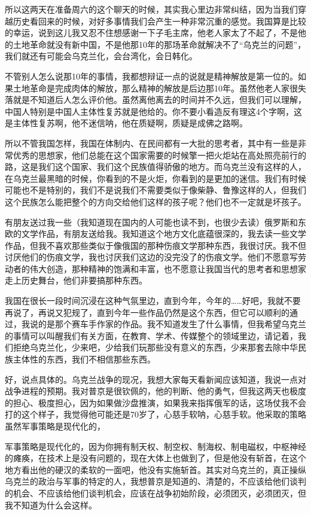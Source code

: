 \documentclass[UTF8, 12pt, a4paper]{ctexrep}
\begin{document}
所以这两天在准备周六的这个聊天的时候，其实我心里边非常纠结，因为当我们穿越历史看回来的时候，对好多事情我们会产生一种非常沉重的感觉。我国算是比较的幸运，说到这儿我又忍不住想感谢一下子毛主席，他老人家太了不起了，不是他的土地革命就没有新中国，不是他那10年的那场革命就解决不了“乌克兰的问题”，我们就还有可能会乌克兰化，会台湾化，会日韩化。

不管别人怎么说那10年的事情，我都想辩证一点的说就是精神解放是第一位的。如果土地革命是完成肉体的解放，那么精神的解放是后边那10年。虽然他老人家很失落就是不知道后人怎么评价他。虽然离他离去的时间并不久远，但我们可以理解，中国人特别是中国人主体性复苏就是他给的。你不要小看造反有理这4个字啊，这是主体性复苏啊，他不迷信呐，他在质疑啊，质疑是成佛之路啊。

所以不管我国怎样，我国在体制内、在民间都有一大批的思考者，其中有一些是非常优秀的思想家，他们总能在这个国家需要的时候擎一把火炬站在高处照亮前行的路，这是我们这个国家、我们这个民族值得骄傲的地方。而乌克兰没有这样的人，在乌克兰最黑暗的时候，你看到的不是火炬，你看到的是更加的迷信。我们有时候可能也不是特别的，我们不是说我们不需要类似于像柴静、鲁豫这样的人，但我们这个民族怎么能把整个的方向交给他们这样的孩子呢？他们也不一定就是坏孩子。

有朋友送过我一些（我知道现在国内的人可能也读不到，也很少去读）俄罗斯和东欧的文学作品，有朋友送给我。我知道这个地方文化底蕴很深的，我去读一些文学作品，但我不喜欢那些类似于像俄国的那种伤痕文学那种东西，我很讨厌。我不但讨厌他们的伤痕文学，我也讨厌我们这边的没完没了的伤痕文学。他们不愿意写劳动者的伟大创造，那种精神的饱满和丰富，也不愿意让我国当代的思考者和思想家走上历史舞台，他们非要搞那种东西。

我国在很长一段时间沉浸在这种气氛里边，直到今年，今年的……好吧，我就不要再说了，再说又犯规了，直到今年一些作品仍然是这个东西，但它可以顺利的通过，我说的是那个赛车手作家的作品。我不知道发生了什么事情，但我希望乌克兰的事情可以叫醒我们有关方面，在教育、学术、传媒整个的领域里边，请记着，我们拒绝乌克兰化，少来吧，少给我们玩那些没有意义的东西，少来那套去除中华民族主体性的东西，我们不相信那些东西。

好，说点具体的。乌克兰战争的现况，我想大家每天看新闻应该知道，我说一点对战争进程的预期。我对普京是很钦佩的，他的判断、他的勇气，但我这两天也极度的担心、极度担心，因为如果做沙盘推演，如果我来指挥俄军的话，这场仗我不会打的这个样子，我觉得他可能还是70岁了，心慈手软呐，心慈手软。他采取的策略虽然军事策略是现代化的，

军事策略是现代化的，因为你拥有制天权、制空权、制海权、制电磁权，中枢神经的瘫痪，在技术上是没有问题的，现在大体上也做到了，但是他没有斩首，在这个地方看出他的硬汉的柔软的一面吧，他没有实施斩首。其实对乌克兰的，真正操纵乌克兰的政治与军事的特定的人，我想普京是知道的、清楚的，不应该给他们谈判的机会、不应该给他们谈判机会，应该在战争初始阶段，必须团灭，必须团灭，但我不知道为什么会这样。
\end{document}
